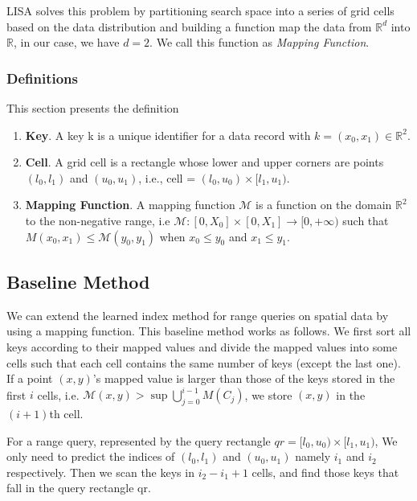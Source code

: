 LISA solves this problem by partitioning search space into a series of grid cells based on the data distribution and building a function map the data from $\mathbb{R}^d$ into $\mathbb{R}$, in our case, we have $d=2$. We call this function as \textit{Mapping Function}.

\subsubsection{Definitions}

This section presents the definition

\begin{enumerate}
	\item \textbf{Key}. A key k is a unique identifier for a data record with $k = (x_{0}, x_{1}) \in \mathbb{R}^{2}$. 
    
	\item \textbf{Cell}. A grid cell is a rectangle whose lower and upper corners are points $(l_0, l_1)$ and  $(u_0,u_1)$, i.e.,  cell = $(l_{0},u_{0}) \times [l_{1},u_{1})$.
	
	\item \textbf{Mapping Function}. A mapping function $\mathcal{M}$ is a function on the domain $\mathbb{R}^2$ to the non-negative range, i.e $\mathcal{M}:[0,X_{0}]\times [0,X_{1}]\to [0,+\infty)$ such that $M(x_0,x_{1}) \leq \mathcal{M}(y_{0},y_1)$ when $x_0 \leq y_0$ and $x_1 \leq y_1$.
\end{enumerate}

\subsection{Baseline Method}  

We can extend the learned index method for range queries on spatial data by using a mapping function. This baseline method works as follows. We first sort all keys according to their mapped values and divide the mapped values into some cells such that each cell contains the same number of keys (except the last one). If a point $(x,y)$’s mapped value is larger than those of the keys stored in the first $i$ cells, i.e. $\mathcal{M}(x,y) > \sup \bigcup\limits_{j=0}^{i-1} M(C_{j})$, we store $(x,y)$ in the $(i+1)$th cell. 

For a range query, represented by the query rectangle $qr = [l_{0},u_{0}) \times [l_{1},u_{1})$, We only need to predict the indices of $(l_{0}, l_{1})$ and $(u_{0},u_{1})$ namely $i_{1}$ and $i_{2}$ respectively. Then we scan the keys in $i_{2}-i_{1}+1$ cells, and find those keys that fall in the query rectangle qr. 


